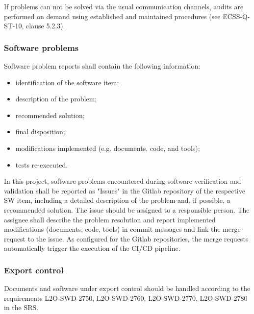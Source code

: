 %

If problems can not be solved via the usual communication channels, audits are performed on demand using established and maintained procedures (see ECSS-Q-ST-10, clause 5.2.3).

\subsubsection{Software problems}
\label{subsec:software-problems}

%

Software problem reports shall contain the following information:
\begin{itemize}
    \item identification of the software item;
    \item description of the problem;
    \item recommended solution;
    \item final disposition;
    \item modifications implemented (e.g. documents, code, and tools);
    \item tests re-executed.
\end{itemize}

In this project, software problems encountered during software verification and validation shall be reported as "Issues" in the Gitlab repository of the respective SW item, including a detailed description of the problem and, if possible, a recommended solution. The issue should be assigned to a responsible person. The assignee shall describe the problem resolution and report implemented modifications (documents, code, tools) in commit messages and link the merge request to the issue. As configured for the Gitlab repositories, the merge requests automatically trigger the execution of the CI/CD pipeline.



\subsubsection{Export control}

Documents and software under export control should be handled according to the requirements L2O-SWD-2750, L2O-SWD-2760, L2O-SWD-2770, L2O-SWD-2780 in the SRS.